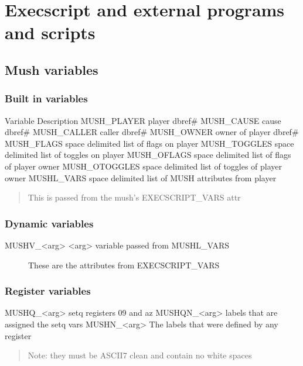 \documentclass[letterpaper,10pt,english]{sphinxmanual}
\begin{document}
\section{Execscript and external programs and scripts}
\label{\detokenize{advanced:execscript-and-external-programs-and-scripts}}

\subsection{Mush variables}
\label{\detokenize{advanced:mush-variables}}

\subsubsection{Built in variables}
\label{\detokenize{advanced:built-in-variables}}
\sphinxAtStartPar
Variable                   Description
MUSH\_PLAYER                player dbref\#
MUSH\_CAUSE                 cause dbref\#
MUSH\_CALLER                caller dbref\#
MUSH\_OWNER                 owner of player dbref\#
MUSH\_FLAGS                 space delimited list of flags on player
MUSH\_TOGGLES               space delimited list of toggles on player
MUSH\_OFLAGS                space delimited list of flags of player owner
MUSH\_OTOGGLES              space delimited list of toggles of player owner
MUSHL\_VARS                 space delimited list of MUSH attributes from player
\begin{quote}

\sphinxAtStartPar
This is passed from the mush’s EXECSCRIPT\_VARS attr
\end{quote}


\subsubsection{Dynamic variables}
\label{\detokenize{advanced:dynamic-variables}}\begin{description}
\item[{MUSHV\_\textless{}arg\textgreater{}                \textless{}arg\textgreater{} variable passed from MUSHL\_VARS}] \leavevmode
\sphinxAtStartPar
These are the attributes from EXECSCRIPT\_VARS

\end{description}


\subsubsection{Register variables}
\label{\detokenize{advanced:register-variables}}
\sphinxAtStartPar
MUSHQ\_\textless{}arg\textgreater{}                setq registers 0\sphinxhyphen{}9 and a\sphinxhyphen{}z
MUSHQN\_\textless{}arg\textgreater{}               labels that are assigned the setq vars
MUSHN\_\textless{}arg\textgreater{}                The labels that were defined by any register
\begin{quote}

\sphinxAtStartPar
Note: they must be ASCII\sphinxhyphen{}7 clean and contain no white spaces
\end{quote}
\end{document}
